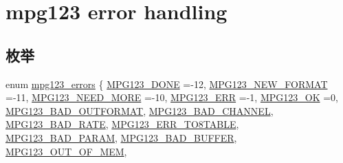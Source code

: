 \hypertarget{group__mpg123__error}{}\section{mpg123 error handling}
\label{group__mpg123__error}
\subsection*{枚举}
\begin{DoxyCompactItemize}
\item 
enum \hyperlink{group__mpg123__error_gac50432012aeaf7c23014de3198dfa5fd}{mpg123\+\_\+errors} \{ \newline
\hyperlink{group__mpg123__error_ggac50432012aeaf7c23014de3198dfa5fdaa70ae24fcae9de17ba5d7196898557ba}{M\+P\+G123\+\_\+\+D\+O\+NE} =-\/12, 
\hyperlink{group__mpg123__error_ggac50432012aeaf7c23014de3198dfa5fda843569efa962ea0e093bae7f190d1da6}{M\+P\+G123\+\_\+\+N\+E\+W\+\_\+\+F\+O\+R\+M\+AT} =-\/11, 
\hyperlink{group__mpg123__error_ggac50432012aeaf7c23014de3198dfa5fda094f4acef73ea2392e2e5d89df96a879}{M\+P\+G123\+\_\+\+N\+E\+E\+D\+\_\+\+M\+O\+RE} =-\/10, 
\hyperlink{group__mpg123__error_ggac50432012aeaf7c23014de3198dfa5fda416b4ef6c8cdc461fe210327819192cd}{M\+P\+G123\+\_\+\+E\+RR} =-\/1, 
\newline
\hyperlink{group__mpg123__error_ggac50432012aeaf7c23014de3198dfa5fdaf2a2fd03e8a2cc34d676f1a416f482e0}{M\+P\+G123\+\_\+\+OK} =0, 
\hyperlink{group__mpg123__error_ggac50432012aeaf7c23014de3198dfa5fda3b12600e50fbe0a81922ef28385890d4}{M\+P\+G123\+\_\+\+B\+A\+D\+\_\+\+O\+U\+T\+F\+O\+R\+M\+AT}, 
\hyperlink{group__mpg123__error_ggac50432012aeaf7c23014de3198dfa5fda2354f3320877398e294a3f140bbb1d24}{M\+P\+G123\+\_\+\+B\+A\+D\+\_\+\+C\+H\+A\+N\+N\+EL}, 
\hyperlink{group__mpg123__error_ggac50432012aeaf7c23014de3198dfa5fdafc8e025f961282382014c063f7c116dd}{M\+P\+G123\+\_\+\+B\+A\+D\+\_\+\+R\+A\+TE}, 
\newline
\hyperlink{group__mpg123__error_ggac50432012aeaf7c23014de3198dfa5fda14286499b7ef3f73012d084e64881896}{M\+P\+G123\+\_\+\+E\+R\+R\+\_\+T\+O8\+T\+A\+B\+LE}, 
\hyperlink{group__mpg123__error_ggac50432012aeaf7c23014de3198dfa5fda10a7e2cfe8420802ef929f0f152571f4}{M\+P\+G123\+\_\+\+B\+A\+D\+\_\+\+P\+A\+R\+AM}, 
\hyperlink{group__mpg123__error_ggac50432012aeaf7c23014de3198dfa5fda3f5d00bf75b553a9f3f96ab4b4bbf23b}{M\+P\+G123\+\_\+\+B\+A\+D\+\_\+\+B\+U\+F\+F\+ER}, 
\hyperlink{group__mpg123__error_ggac50432012aeaf7c23014de3198dfa5fda631e5674fd95abd99992b43bb91afa94}{M\+P\+G123\+\_\+\+O\+U\+T\+\_\+\+O\+F\+\_\+\+M\+EM}, 

\end{DoxyCompactItemize}
